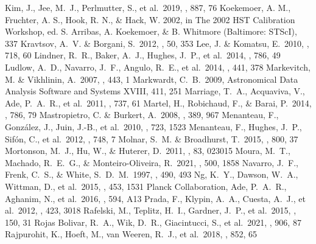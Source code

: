 \documentclass[twocolumn]{aastex631}
\begin{document}
\begin{thebibliography}{}
 Kim, J., Jee, M.~J., Perlmutter, S., et al.\ 2019, \apj, 887, 76 
 Koekemoer, A. M., Fruchter, A. S., Hook, R. N., \& Hack, W. 2002, in The 2002 HST Calibration Workshop, ed. S. Arribas, A. Koekemoer, \& B. Whitmore (Baltimore: STScI), 337
 Kravtsov, A.~V. \& Borgani, S.\ 2012, \araa, 50, 353
 Lee, J. \& Komatsu, E.\ 2010, \apj, 718, 60
 Lindner, R.~R., Baker, A.~J., Hughes, J.~P., et al.\ 2014, \apj, 786, 49
 Ludlow, A.~D., Navarro, J.~F., Angulo, R.~E., et al.\ 2014, \mnras, 441, 378
 Markevitch, M. \& Vikhlinin, A.\ 2007, \physrep, 443, 1
 Markwardt, C.~B.\ 2009, Astronomical Data Analysis Software and Systems XVIII, 411, 251
 Marriage, T.~A., Acquaviva, V., Ade, P.~A.~R., et al.\ 2011, \apj, 737, 61
 Martel, H., Robichaud, F., \& Barai, P.\ 2014, \apj, 786, 79
 Mastropietro, C. \& Burkert, A.\ 2008, \mnras, 389, 967
 Menanteau, F., Gonz{\'a}lez, J., Juin, J.-B., et al.\ 2010, \apj, 723, 1523
 Menanteau, F., Hughes, J.~P., Sif{\'o}n, C., et al.\ 2012, \apj, 748, 7
 Molnar, S.~M. \& Broadhurst, T.\ 2015, \apj, 800, 37
 Mortonson, M.~J., Hu, W., \& Huterer, D.\ 2011, \prd, 83, 023015
 Moura, M.~T., Machado, R.~E.~G., \& Monteiro-Oliveira, R.\ 2021, \mnras, 500, 1858
 Navarro, J.~F., Frenk, C.~S., \& White, S.~D.~M.\ 1997, \apj, 490, 493
 Ng, K.~Y., Dawson, W.~A., Wittman, D., et al.\ 2015, \mnras, 453, 1531
 Planck Collaboration, Ade, P.~A.~R., Aghanim, N., et al.\ 2016, \aap, 594, A13
 Prada, F., Klypin, A.~A., Cuesta, A.~J., et al.\ 2012, \mnras, 423, 3018
 Rafelski, M., Teplitz, H.~I., Gardner, J.~P., et al.\ 2015, \aj, 150, 31
 Rojas Bolivar, R.~A., Wik, D.~R., Giacintucci, S., et al.\ 2021, \apj, 906, 87
 Rajpurohit, K., Hoeft, M., van Weeren, R.~J., et al.\ 2018, \apj, 852, 65

\end{thebibliography}
\end{document}

